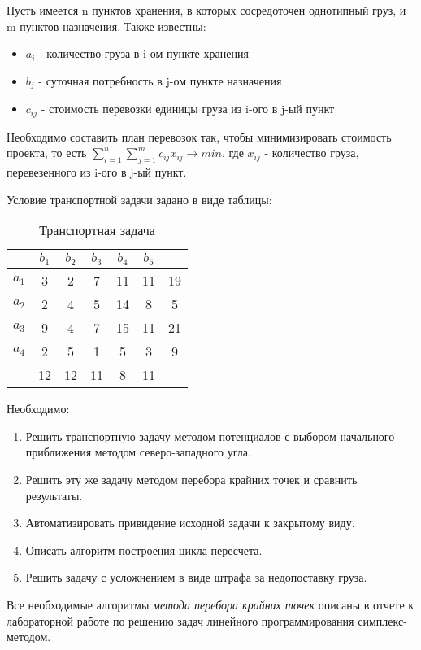 \documentclass[../body.tex]{subfiles}
\begin{document}
Пусть имеется n пунктов хранения, в которых сосредоточен однотипный груз, и m пунктов назначения. Также известны:
\begin{itemize}
    \item $a_i$ - количество груза в i-ом пункте хранения
    \item $b_j$ - суточная потребность в j-ом пункте назначения
    \item $c_{ij}$ - стоимость перевозки единицы груза из i-ого в j-ый пункт
\end{itemize}

Необходимо составить план перевозок так, чтобы минимизировать стоимость проекта, то есть $\sum_{i=1}^{n}\sum_{j=1}^{m} c_{ij}x_{ij}\rightarrow min$, где $x_{ij}$ - количество груза, перевезенного из i-ого в j-ый пункт. 

Условие транспортной задачи задано в виде таблицы:
\begin{table}[h]
    \centering
    \begin{tabular}{|c|c|c|c|c|c||c|}
        \hline
        & $b_1$ & $b_2$ & $b_3$ & $b_4$ & $b_5$ & \\\hline
        $a_1$ & 3 & 2 & 7 & 11 & 11 & 19\\\hline
        $a_2$ & 2 & 4 & 5 & 14 & 8 & 5\\\hline
        $a_3$ & 9 & 4 & 7 & 15 & 11 & 21\\\hline
        $a_4$ & 2 & 5 & 1 & 5 & 3 & 9\\\hline
        & 12 & 12 & 11 & 8 & 11 & \\\hline
    \end{tabular}
    \caption{Транспортная задача}
    \label{tab:task}
\end{table}

Необходимо:
\begin{enumerate}
	\item Решить транспортную задачу методом потенциалов с выбором начального приближения методом северо-западного угла.
	\item Решить эту же задачу методом перебора крайних точек и сравнить результаты.
	\item Автоматизировать привидение исходной задачи к закрытому виду.
	\item Описать алгоритм построения цикла пересчета.
	\item Решить задачу с усложнением в виде штрафа за недопоставку груза.
\end{enumerate}

Все необходимые алгоритмы \textit{метода перебора крайних точек} описаны в отчете к лабораторной работе по решению задач линейного программирования симплекс-методом.
\end{document}
